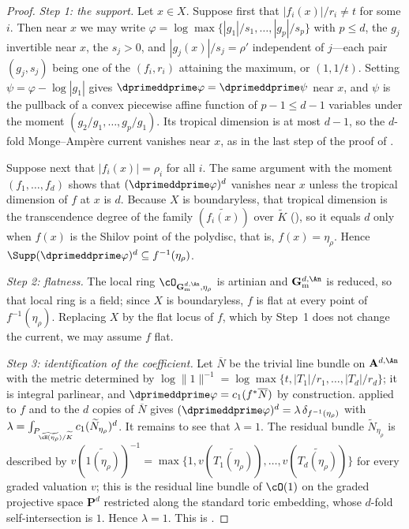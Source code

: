 \begin{proof}
\emph{Step 1: the support.}  Let $x\in X$.  Suppose first that
$|f_i(x)|/r_i\ne t$ for some $i$.  Then near $x$ we may write
$\varphi=\log\max\{|g_1|/s_1,\dots,|g_p|/s_p\}$ with $p\le d$, the
$g_j$ invertible near $x$, the $s_j>0$, and $|g_j(x)|/s_j=\rho'$
independent of $j$---each pair $(g_j,s_j)$ being one of the
$(f_i,r_i)$ attaining the maximum, or $(1,1/t)$.  Setting
$\psi=\varphi-\log|g_1|$ gives $\dprimeddprime\varphi=\dprimeddprime\psi$
near $x$, and $\psi$ is the pullback of a convex piecewise affine
function of $p-1\le d-1$ variables under the moment
$(g_2/g_1,\dots,g_p/g_1)$.  Its tropical dimension is at most $d-1$, so
the $d$-fold Monge--Amp\`ere current vanishes near $x$, as in the last
step of the proof of .

Suppose next that $|f_i(x)|=\rho_i$ for all $i$.  The same argument with
the moment $(f_1,\dots,f_d)$ shows that
$(\dprimeddprime\varphi)^d$ vanishes near $x$ unless the tropical
dimension of $f$ at $x$ is $d$.  Because $X$ is boundaryless, that
tropical dimension is the transcendence degree of the family
$(\widetilde{f_i(x)})$ over $\widetilde K$
(), so it equals $d$ only when
$f(x)$ is the Shilov point of the polydisc, that is, $f(x)=\eta_\rho$.
Hence $\Supp(\dprimeddprime\varphi)^d\subseteq f^{-1}(\eta_\rho)$.

\emph{Step 2: flatness.}  The local ring
$\cO_{\mathbf G_{\mathrm m}^{d,\An},\eta_\rho}$ is artinian and
$\mathbf G_{\mathrm m}^{d,\An}$ is reduced, so that local ring is a field;
since $X$ is boundaryless, $f$ is flat at every point of
$f^{-1}(\eta_\rho)$.  Replacing $X$ by the flat locus of $f$, which
by Step~1 does not change the current, we may assume $f$ flat.

\emph{Step 3: identification of the coefficient.}  Let $\overline N$ be
the trivial line bundle on $\mathbf A^{d,\An}$ with the metric determined
by $\log\|1\|^{-1}=\log\max\{t,|T_1|/r_1,\dots,|T_d|/r_d\}$; it is
integral parlinear, and $\dprimeddprime\varphi=c_1(f^*\overline N)$ by
construction.   applied to $f$ and to the
$d$ copies of $\overline N$ gives
$(\dprimeddprime\varphi)^d=\lambda\,\delta_{f^{-1}(\eta_\rho)}$ with
$\lambda=\int_{P_{\widetilde{\cH(\eta_\rho)}/\widetilde K}}
 c_1(\widetilde N_{\eta_\rho})^d$.
It remains to see that $\lambda=1$.  The residual bundle
$\widetilde N_{\eta_\rho}$ is described by
$v(\widetilde{1(\eta_\rho)})^{-1}
 =\max\{1,v(\widetilde{T_1(\eta_\rho)}),\dots,
        v(\widetilde{T_d(\eta_\rho)})\}$
for every graded valuation $v$; this is the residual line bundle of
$\cO(1)$ on the graded projective space $\mathbf P^d$ restricted along
the standard toric embedding, whose $d$-fold self-intersection is $1$.
Hence $\lambda=1$.  This is \cite[Corollary~18.6.2]{CLD25}.
\end{proof}


